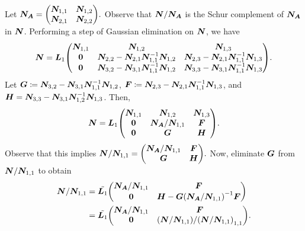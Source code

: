\documentclass[twoside,10pt]{article}
\begin{document}
Let $\mtx{N_A} =\begin{pmatrix}
  \mtx{N}_{1, 1} & \mtx{N}_{1, 2} \\
  \mtx{N}_{2, 1} & \mtx{N}_{2, 2} 
\end{pmatrix}.$ Observe that $\bm{N} / \bm{N_A}$ is the Schur complement of $\bm{N_A}$ in $\bm{N}$.
Performing a step of Gaussian elimination on $\bm{N}$, we have
\begin{equation*}
  \mtx{N} = \mtx{L}_1\begin{pmatrix}
    \mtx{N}_{1,1} & \mtx{N}_{1,2} & \mtx{N}_{1,3} \\
    \mtx{0} & \mtx{N}_{2,2} - \mtx{N}_{2,1}\mtx{N}_{1,1}^{-1}\mtx{N}_{1,2} & \mtx{N}_{2,3} - \mtx{N}_{2,1}\mtx{N}_{1,1}^{-1}\mtx{N}_{1,3} \\
    \mtx{0} & \mtx{N}_{3,2} - \mtx{N}_{3,1}\mtx{N}_{1,1}^{-1}\mtx{N}_{1,2} & \mtx{N}_{3,3} - \mtx{N}_{3,1}\mtx{N}_{1,1}^{-1}\mtx{N}_{1,3}
  \end{pmatrix}.
\end{equation*}
Let $\bm{G} \coloneqq \bm{N}_{3,2} - \bm{N}_{3,1}\bm{N}_{1,1}^{-1}\bm{N}_{1,2}$, $\bm{F} \coloneqq \bm{N}_{2,3} - \bm{N}_{2,1}\bm{N}_{1,1}^{-1}\bm{N}_{1,3}$, and $\bm{H} = \bm{N}_{3,3} - \bm{N}_{3,1}\bm{N}_{1,2}^{-1}\bm{N}_{1,3}$. Then,
\begin{equation*}
  \mtx{N} = \mtx{L}_1\begin{pmatrix}
    \mtx{N}_{1,1} & \mtx{N}_{1,2} & \mtx{N}_{1,3} \\
    \mtx{0} & \mtx{N_{A}} / \mtx{N}_{1,1} & \mtx{F}\\
    \mtx{0} & \mtx{G} & \mtx{H}
  \end{pmatrix}.
\end{equation*}
Observe that this implies $\mtx{N} / \mtx{N}_{1,1} = \begin{pmatrix}
    \mtx{N_{A}} / \mtx{N}_{1,1} & \mtx{F}\\
    \mtx{G} & \mtx{H}
  \end{pmatrix}.$
Now, eliminate $\bm{G}$ from $\bm{N} / \bm{N}_{1,1}$ to obtain
\begin{align*}
  \mtx{N} / \mtx{N}_{1,1} &= \tilde{\mtx{L}_1}\begin{pmatrix}
    \mtx{N_{A}} / \mtx{N}_{1,1} & \mtx{F}\\
    \mtx{0} & \mtx{H} - \mtx{G} \left(\mtx{N_{A}} / \mtx{N}_{1,1}\right)^{-1} \mtx{F}
  \end{pmatrix}\\
  &= \tilde{\mtx{L}_1}\begin{pmatrix}
    \mtx{N_{A}} / \mtx{N}_{1,1} & \mtx{F}\\
    \mtx{0} & \left(\mtx{N} / \mtx{N}_{1, 1}\right) / \left(\mtx{N} / \mtx{N}_{1, 1}\right)_{1, 1} 
  \end{pmatrix}.
\end{align*}
\end{document}
